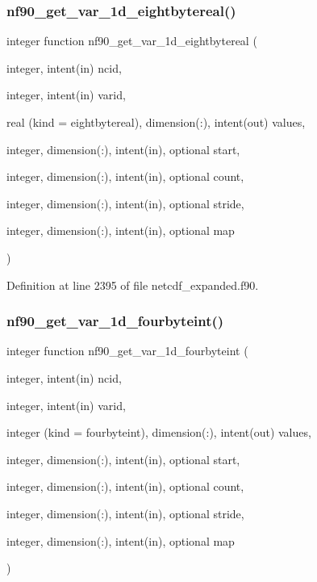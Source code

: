 \subsubsection{\texorpdfstring{nf90\+\_\+get\+\_\+var\+\_\+1d\+\_\+eightbytereal()}{nf90\_get\_var\_1d\_eightbytereal()}}
{\footnotesize\ttfamily integer function nf90\+\_\+get\+\_\+var\+\_\+1d\+\_\+eightbytereal (\begin{DoxyParamCaption}\item[{integer, intent(in)}]{ncid,  }\item[{integer, intent(in)}]{varid,  }\item[{real (kind = eightbytereal), dimension(\+:), intent(out)}]{values,  }\item[{integer, dimension(\+:), intent(in), optional}]{start,  }\item[{integer, dimension(\+:), intent(in), optional}]{count,  }\item[{integer, dimension(\+:), intent(in), optional}]{stride,  }\item[{integer, dimension(\+:), intent(in), optional}]{map }\end{DoxyParamCaption})}



Definition at line 2395 of file netcdf\+\_\+expanded.\+f90.

\mbox{\label{netcdf__expanded_8f90_a5847c43a08008a77c3244aab2fe5e1c3}} 
\subsubsection{\texorpdfstring{nf90\+\_\+get\+\_\+var\+\_\+1d\+\_\+fourbyteint()}{nf90\_get\_var\_1d\_fourbyteint()}}
{\footnotesize\ttfamily integer function nf90\+\_\+get\+\_\+var\+\_\+1d\+\_\+fourbyteint (\begin{DoxyParamCaption}\item[{integer, intent(in)}]{ncid,  }\item[{integer, intent(in)}]{varid,  }\item[{integer (kind = fourbyteint), dimension(\+:), intent(out)}]{values,  }\item[{integer, dimension(\+:), intent(in), optional}]{start,  }\item[{integer, dimension(\+:), intent(in), optional}]{count,  }\item[{integer, dimension(\+:), intent(in), optional}]{stride,  }\item[{integer, dimension(\+:), intent(in), optional}]{map }\end{DoxyParamCaption})}



